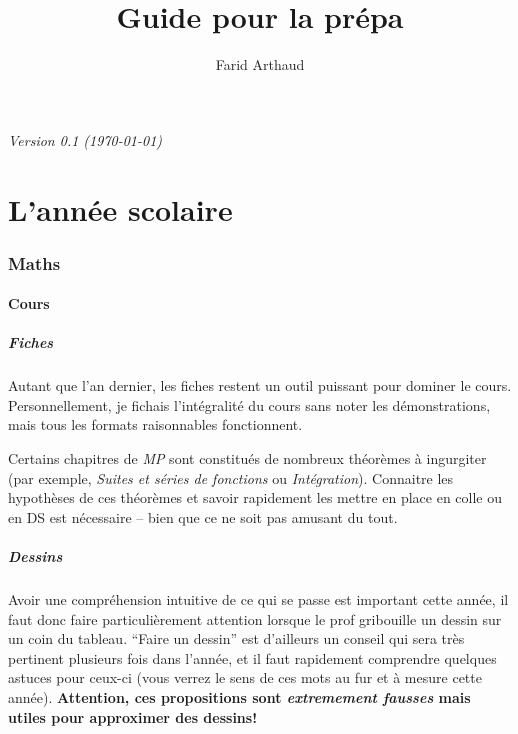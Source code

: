 \documentclass{article}
\begin{document}
\title{Guide pour la prépa}
\author{Farid Arthaud}
\maketitle
\tableofcontents

\textit{Version 0.1 (\today)}

\part{L'année scolaire}
\section{Maths}
\subsection{Cours}
\subsubsection{Fiches}

Autant que l'an dernier, les fiches restent un outil puissant pour dominer le cours.
Personnellement, je fichais l'intégralité du cours sans noter les démonstrations, mais tous les formats raisonnables fonctionnent.

Certains chapitres de \textit{MP} sont constitués de nombreux théorèmes à ingurgiter (par exemple, \textit{Suites et séries de fonctions} ou \textit{Intégration}).
Connaitre les hypothèses de ces théorèmes et savoir rapidement les mettre en place en colle ou en DS est nécessaire -- bien que ce ne soit pas amusant du tout.

\subsubsection{Dessins}

Avoir une compréhension intuitive de ce qui se passe est important cette année, il faut donc faire particulièrement attention lorsque le prof gribouille un dessin sur un coin du tableau.
``Faire un dessin'' est d'ailleurs un conseil qui sera très pertinent plusieurs fois dans l'année, et il faut rapidement comprendre quelques astuces pour ceux-ci (vous verrez le sens de ces mots au fur et à mesure cette année).
\textbf{Attention, ces propositions sont \textit{extremement fausses} mais utiles pour approximer des dessins!}
\end{document}
